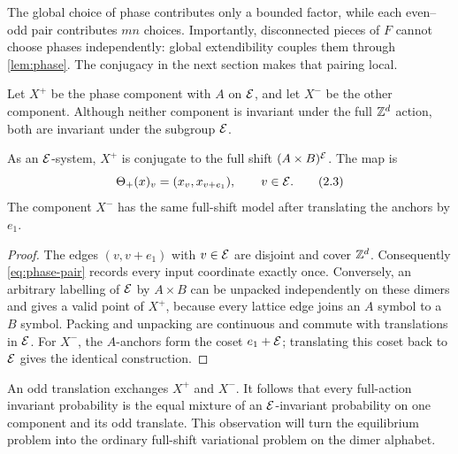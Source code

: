 The global choice of phase contributes only a bounded factor, while each
even--odd pair contributes $mn$ choices.  Importantly, disconnected pieces
of $F$ cannot choose phases independently: global extendibility couples them
through \cref{lem:phase}.  The conjugacy in the next section makes that
pairing local.

Let $X^+$ be the phase component with $A$ on $\mathcal E$, and let $X^-$ be the
other component.  Although neither component is invariant under the full
$\mathbb Z^d$ action, both are invariant under the subgroup $\mathcal E$.

\begin{proposition}\label{prop:phase-full}
As an $\mathcal E$-system, $X^+$ is conjugate to the full shift
$(A\times B)^{\mathcal E}$.  The map is
\[
 \Theta_+(x)_v=(x_v,x_{v+e_1}),\qquad v\in\mathcal E.
 \tag{2.3}\label{eq:phase-pair}
\]
The component $X^-$ has the same full-shift model after translating the
anchors by $e_1$.
\end{proposition}

\begin{proof}
The edges $(v,v+e_1)$ with $v\in\mathcal E$ are disjoint and cover $\mathbb Z^d$.
Consequently \eqref{eq:phase-pair} records every input coordinate exactly
once.  Conversely, an arbitrary labelling of $\mathcal E$ by $A\times B$ can be
unpacked independently on these dimers and gives a valid point of $X^+$,
because every lattice edge joins an $A$ symbol to a $B$ symbol.  Packing and
unpacking are continuous and commute with translations in $\mathcal E$.  For $X^-$,
the $A$-anchors form the coset $e_1+\mathcal E$; translating this coset back to
$\mathcal E$ gives the identical construction.
\end{proof}

An odd translation exchanges $X^+$ and $X^-$.  It follows that every
full-action invariant probability is the equal mixture of an
$\mathcal E$-invariant probability on one component and its odd translate.  This
observation will turn the equilibrium problem into the ordinary full-shift
variational problem on the dimer alphabet.
